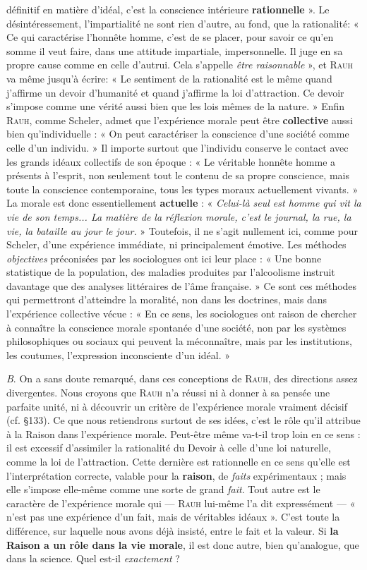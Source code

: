 définitif en matière d’idéal, c’est la conscience intérieure {\bf rationnelle} ».
Le désintéressement, l’impartialité ne sont rien d’autre, au fond, que
la rationalité: « Ce qui caractérise l’honnête homme, c’est de se placer,
pour savoir ce qu’en somme il veut faire, dans une attitude impartiale,
impersonnelle. Il juge en sa propre cause comme en celle d’autrui. Cela
s’appelle {\it être raisonnable} », et \textsc{Rauh} va même jusqu’à écrire: « Le sentiment
de la rationalité est le même quand j’affirme un devoir d’humanité
et quand j’affirme la loi d'attraction. Ce devoir s'impose comme une
vérité aussi bien que les lois mêmes de la nature. » Enfin \textsc{Rauh}, comme
Scheler, admet que l'expérience morale peut être {\bf collective} aussi bien
qu’individuelle : « On peut caractériser la conscience d’une société comme
celle d’un individu. » Il importe surtout que l’individu conserve le
contact avec les grands idéaux collectifs de son époque : « Le véritable
honnête homme a présents à l’esprit, non seulement tout le contenu
de sa propre conscience, mais toute la conscience contemporaine,
tous les types moraux actuellement vivants. » La morale est donc
essentiellement {\bf actuelle} : « {\it Celui-là seul est homme qui vit la vie de
son temps... La matière de la réflexion morale, c’est le journal, la rue,
la vie, la bataille au jour le jour.} » Toutefois, il ne s’agit nullement ici,
comme pour Scheler, d’une expérience immédiate, ni principalement
émotive. Les méthodes {\it objectives} préconisées par les sociologues ont
ici leur place : « Une bonne statistique de la population, des maladies
produites par l'alcoolisme instruit davantage que des analyses littéraires
de l’âme française. » Ce sont ces méthodes qui permettront
d'atteindre la moralité, non dans les doctrines, mais dans l'expérience
collective vécue : « En ce sens, les sociologues ont raison de chercher
à connaître la conscience morale spontanée d’une société, non par les
systèmes philosophiques ou sociaux qui peuvent la méconnaître,
mais par les institutions, les coutumes, l’expression inconsciente d’un
idéal. »

{\it B}. On a sans doute remarqué, dans ces conceptions de \textsc{Rauh}, des
directions assez divergentes. Nous croyons que \textsc{Rauh} n’a réussi ni
à donner à sa pensée une parfaite unité, ni à découvrir un critère de
l'expérience morale vraiment décisif (cf. \S 133). Ce que nous retiendrons
surtout de ses idées, c’est le rôle qu’il attribue à la Raison dans
l'expérience morale. Peut-être même va-t-il trop loin en ce sens : il est
excessif d’assimiler la rationalité du Devoir à celle d’une loi naturelle,
comme la loi de l'attraction. Cette dernière est rationnelle en ce sens
qu’elle est l’interprétation correcte, valable pour la {\bf raison}, de {\it faits}
expérimentaux ; mais elle s’impose elle-même comme une sorte de
grand {\it fait}. Tout autre est le caractère de l'expérience morale qui —
\textsc{Rauh} lui-même l’a dit expressément — « n’est pas une expérience d’un
fait, mais de véritables idéaux ». C’est toute la différence, sur laquelle
nous avons déjà insisté, entre le fait et la valeur. Si {\bf la Raison a un rôle
dans la vie morale}, il est donc autre, bien qu’analogue, que dans la
science. Quel est-il {\it exactement} ?


